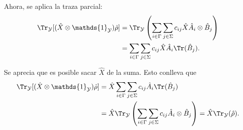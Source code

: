 Ahora, se aplica la traza parcial:
\begin{align*}
    \Tr_{\mathcal{Y}}[(\hat{X} \otimes \mathds{1}_{\mathcal{Y}})\hat{\rho}]
    &= \Tr_{\mathcal{Y}}\left(\sum_{i\in\Gamma} \sum_{j\in\Sigma} c_{ij}\hat{X}\hat{A}_{i} \otimes \hat{B}_{j}\right)\\
    &= \sum_{i\in\Gamma} \sum_{j\in\Sigma} c_{ij}\hat{X}\hat{A}_{i} \Tr(\hat{B}_{j}).
\end{align*}

Se aprecia que es posible sacar $\hat{X}$ de la suma. Esto conlleva que
\begin{align*}
    \Tr_{\mathcal{Y}} [(\hat{X} \otimes \mathds{1}_{\mathcal{Y}})\hat{\rho}]
    &= \hat{X} \sum_{i \in \Gamma} \sum_{j \in \Sigma} c_{ij} \hat{A}_{i} \Tr(\hat{B}_{j})\\
    &= \hat{X} \Tr_{\mathcal{Y}} \left(\sum_{i\in\Gamma} \sum_{j \in \Sigma} c_{ij} \hat{A}_{i} \otimes \hat{B}_{j}\right) = \hat{X} \Tr_{\mathcal{Y}} (\hat{\rho}).
\end{align*}

\lipsum[4-4]